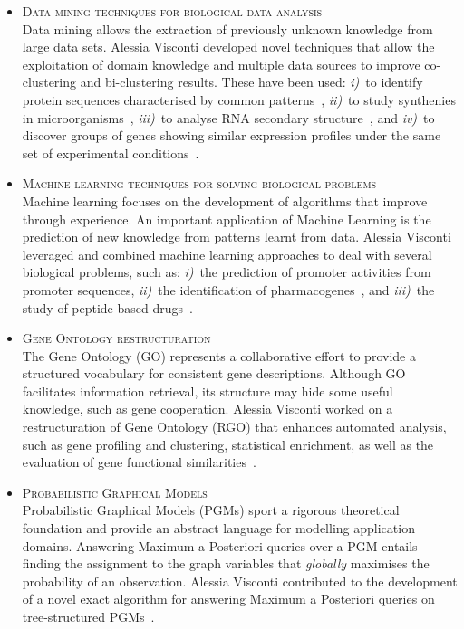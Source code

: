 \documentclass[a4paper,10pt]{article}
\newcommand{\smalltitle}[1]{
	\vspace{0.1cm}
	{\noindent 
	\large \textsc{#1}}
	\vspace{0.1cm}
}
\newcommand{\bulletitem}{\item[$\bullet$]}
\begin{document}
\begin{itemize}
\bulletitem \smalltitle{Data mining techniques for biological data analysis}\\
Data mining allows the extraction of previously unknown knowledge from large data sets.
Alessia Visconti developed novel techniques that allow the exploitation of domain knowledge and multiple data sources to improve co-clustering and bi-clustering results.
These have been used: \emph{i)}~to identify protein sequences characterised by common patterns~\cite{Vis08, Cor09a, Cor08b}, \emph{ii)}~to study synthenies in microorganisms~\cite{Bon11}, \emph{iii)}~to analyse RNA secondary structure~\cite{Cor08a}, and \emph{iv)}~to discover groups of genes showing similar expression profiles under the same set of experimental conditions~\cite{Vis13a, Cor09b, Vis11c, Vis12b}.

\bulletitem \smalltitle{Machine learning techniques for solving biological problems}\\
Machine learning focuses on the development of algorithms that improve through experience. An important application of Machine Learning  is the prediction of new knowledge from patterns learnt from data. 
Alessia Visconti leveraged and combined machine learning approaches to deal with several biological problems, such as: \emph{i)}~the prediction of promoter activities from promoter sequences, \emph{ii)}~the identification of pharmacogenes~\cite{Vis12a, Vis12b}, and \emph{iii)}~the study of peptide-based drugs~\cite{Erm14, Vis15a, Erm13a}.

\bulletitem \smalltitle{Gene Ontology restructuration} \\
The Gene Ontology (GO) represents a collaborative effort to provide a structured vocabulary for consistent gene descriptions. Although GO facilitates information retrieval, its structure may hide some useful knowledge, such as gene cooperation.
Alessia Visconti worked on a restructuration of Gene Ontology (RGO) that enhances automated analysis, such as gene profiling and clustering, statistical enrichment, as well as the evaluation of gene functional similarities~\cite{Vis11a, Vis10a, Vis12b}.

\bulletitem \smalltitle{Probabilistic Graphical Models}\\
Probabilistic Graphical Models (PGMs) sport a rigorous theoretical foundation and provide an abstract language for modelling application domains. Answering Maximum a Posteriori queries over a PGM entails finding the assignment to the graph variables that \emph{globally} maximises the probability of an observation. 
Alessia Visconti contributed to the development of a novel exact algorithm for answering Maximum a Posteriori queries on tree-structured PGMs~\cite{Esp13}.

\end{itemize}
\end{document}
